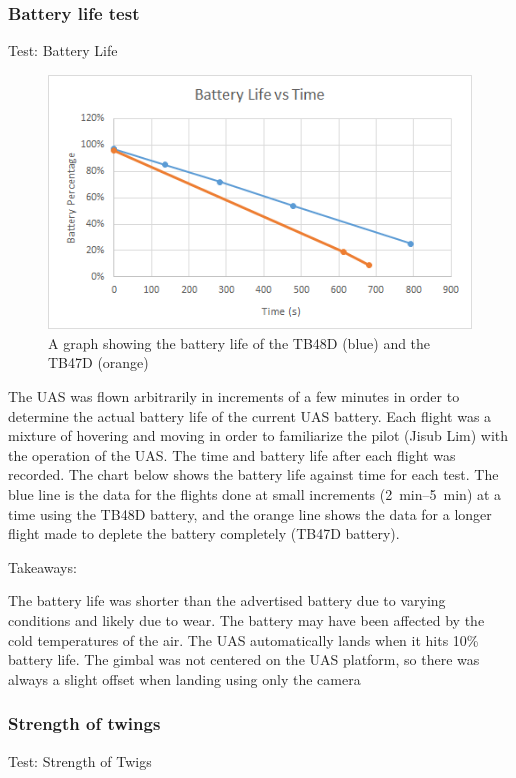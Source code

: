 \documentclass{wrcecapstone}
\begin{document}
\subsubsection{Battery life test}
Test: Battery Life
\begin{figure}
\begin{center}
\includegraphics[width=\columnwidth]{figures/fig923.png}
\end{center}
\caption{A graph showing the battery life of the TB48D (blue) and the TB47D (orange)}
\label{fig:9.2.3}
\end{figure}

The UAS was flown arbitrarily in increments of a few minutes in order to determine the actual battery life of the current UAS battery.  Each flight was a mixture of hovering and moving in order to familiarize the pilot (Jisub Lim) with the operation of the UAS.  The time and battery life after each flight was recorded.  The chart below shows the battery life against time for each test.  The blue line is the data for the flights done at small increments (\SIrange{2}{5}{\minute}) at a time using the TB48D battery, and the orange line shows the data for a longer flight made to deplete the battery completely (TB47D battery).

Takeaways:  

The battery life was shorter than the advertised battery due to varying conditions and likely due to wear. The battery may have been affected by the cold temperatures of the air. The UAS automatically lands when it hits 10\% battery life. The gimbal was not centered on the UAS platform, so there was always a slight offset when landing using only the camera




\subsubsection{Strength of twings}
Test: Strength of Twigs
\end{document}
